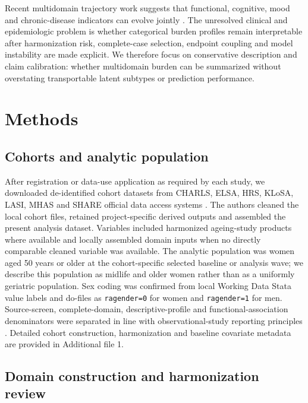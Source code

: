 \documentclass[pdflatex,sn-vancouver-num]{sn-jnl}
\begin{document}
Recent multidomain trajectory work suggests that functional, cognitive, mood and chronic-disease indicators can evolve jointly \cite{quinones2022multidimensional}. The unresolved clinical and epidemiologic problem is whether categorical burden profiles remain interpretable after harmonization risk, complete-case selection, endpoint coupling and model instability are made explicit. We therefore focus on conservative description and claim calibration: whether multidomain burden can be summarized without overstating transportable latent subtypes or prediction performance.

\section{Methods}\label{sec:methods}

\subsection{Cohorts and analytic population}

After registration or data-use application as required by each study, we downloaded de-identified cohort datasets from CHARLS, ELSA, HRS, KLoSA, LASI, MHAS and SHARE official data access systems \cite{zhao2014charls,steptoe2013elsa,sonnega2014hrs,keis2026klosa,perianayagam2022lasi,wong2017mhas,borschsupan2013share}. The authors cleaned the local cohort files, retained project-specific derived outputs and assembled the present analysis dataset. Variables included harmonized ageing-study products where available \cite{lee2021gateway} and locally assembled domain inputs when no directly comparable cleaned variable was available. The analytic population was women aged 50 years or older at the cohort-specific selected baseline or analysis wave; we describe this population as midlife and older women rather than as a uniformly geriatric population. Sex coding was confirmed from local Working Data Stata value labels and do-files as \texttt{ragender=0} for women and \texttt{ragender=1} for men. Source-screen, complete-domain, descriptive-profile and functional-association denominators were separated in line with observational-study reporting principles \cite{vonelm2007strobe}. Detailed cohort construction, harmonization and baseline covariate metadata are provided in Additional file 1.

\subsection{Domain construction and harmonization review}
\end{document}
